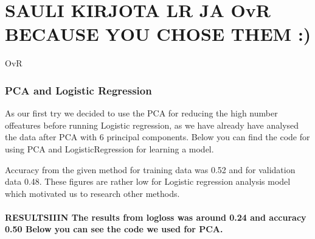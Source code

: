 \documentclass[11pt]{article}
\begin{document}
\hypertarget{sauli-kirjota-lr-ja-ovr-because-you-chose-them}{%
\section{SAULI KIRJOTA LR JA OvR BECAUSE YOU CHOSE THEM
:)}\label{sauli-kirjota-lr-ja-ovr-because-you-chose-them}}

OvR

\hypertarget{pca-and-logistic-regression}{%
\subsubsection{PCA and Logistic
Regression}\label{pca-and-logistic-regression}}

As our first try we decided to use the PCA for reducing the high number
offeatures before running Logistic regression, as we have already have
analysed the data after PCA with 6 principal components. Below you can
find the code for using PCA and LogisticRegression for learning a model.

Accuracy from the given method for training data was 0.52 and for
validation data 0.48. These figures are rather low for Logistic
regression analysis model which motivated us to research other methods.

\hypertarget{resultsiiin-the-results-from-logloss-was-around-0.24-and-accuracy-0.50-below-you-can-see-the-code-we-used-for-pca.}{%
\paragraph{RESULTSIIIN The results from logloss was around 0.24 and
accuracy 0.50 Below you can see the code we used for
PCA.}\label{resultsiiin-the-results-from-logloss-was-around-0.24-and-accuracy-0.50-below-you-can-see-the-code-we-used-for-pca.}}
\end{document}
